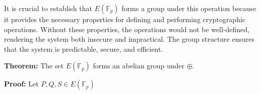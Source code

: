 \documentclass[11pt]{article}
\begin{document}
 \vspace{0.3cm}

It is crucial to establish that \(E(\mathbb{F}_p)\) forms a group under this operation because it provides the necessary properties for defining and performing cryptographic operations. Without these properties, the operations would not be well-defined, rendering the system both insecure and impractical. The group structure ensures that the system is predictable, secure, and efficient.

\vspace{0.5cm}




\textbf{Theorem:} The set \( E(\mathbb{F}_p) \) forms an abelian group under \(\oplus\).

\vspace{0.3cm}

\textbf{Proof:}
Let \(P,Q,S\in E(\mathbb{F}_p)\)
\end{document}
